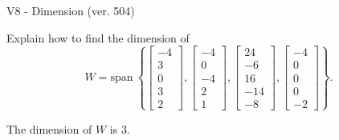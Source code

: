 \begin{exercise}
  \begin{exerciseTitle}V8 - Dimension (ver. 504)\end{exerciseTitle}
  \begin{exerciseStatement}
    Explain how to find the dimension of 
\[W=\mathrm{span}\ \left\{\left[\begin{array}{r}
-4 \\
3 \\
0 \\
3 \\
2
\end{array}\right] , \left[\begin{array}{r}
-4 \\
0 \\
-4 \\
2 \\
1
\end{array}\right] , \left[\begin{array}{r}
24 \\
-6 \\
16 \\
-14 \\
-8
\end{array}\right] , \left[\begin{array}{r}
-4 \\
0 \\
0 \\
0 \\
-2
\end{array}\right]\right\}.\]



  \end{exerciseStatement}
  \begin{exerciseAnswer}
   The dimension of \(W\) is  \(3\).
  


  \end{exerciseAnswer}
\end{exercise}
